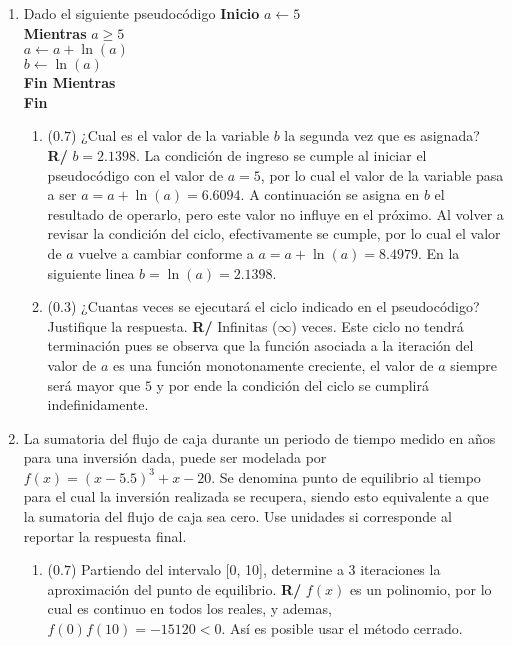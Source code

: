 \documentclass[12pt]{article}
\begin{document}
\vspace{-.5cm}
  \begin{enumerate}[leftmargin=*,widest=9]
    \item Dado el siguiente pseudocódigo
\textbf{Inicio}
\(a\gets 5\)\\
\textbf{Mientras} \(a \geq 5\)\\
\hspace*{1cm}\(a \gets a + \ln(a)\)\\
\hspace*{1cm}\(b \gets \ln(a) \)\\
\textbf{Fin Mientras}\\
\textbf{Fin}\\
    \begin{enumerate}[label=\alph*]
    \item (\(0.7\)) ¿Cual es el valor de la variable \(b\) la segunda vez que es asignada?
     \textbf{R/} \(b=2.1398\). La condición de ingreso se cumple al iniciar el pseudocódigo con el valor de \(a = 5\), por lo cual el valor de la variable pasa a ser \(a = a + \ln(a) = 6.6094\). A continuación se asigna en \(b\) el resultado de operarlo, pero este valor no influye en el próximo. Al volver a revisar la condición del ciclo, efectivamente se cumple, por lo cual el valor de \(a\) vuelve a cambiar conforme a \(a= a+\ln(a) =  8.4979\). En la siguiente linea \(b = \ln(a) = 2.1398 \).
    \item (\(0.3\)) ¿Cuantas veces se ejecutará el ciclo indicado en el pseudocódigo? Justifique la respuesta.
     \textbf{R/} Infinitas (\(\infty\)) veces. Este ciclo no tendrá terminación pues se observa que la función asociada a la iteración del valor de \(a\) es una función monotonamente creciente, el valor de \(a\) siempre será mayor que \(5\) y por ende la condición del ciclo se cumplirá indefinidamente.
    \end{enumerate}
    \item La sumatoria del flujo de caja durante un periodo de tiempo medido en años para una inversión dada, puede ser modelada por \(f(x) = (x-5.5)^3 + x - 20\). Se denomina punto de equilibrio al tiempo para el cual la inversión realizada se recupera, siendo esto equivalente a que la sumatoria del flujo de caja sea cero. Use unidades si corresponde al reportar la respuesta final.
    \begin{enumerate}[label=\alph*]
    \item (\(0.7\)) Partiendo del intervalo [0, 10], determine a 3 iteraciones la aproximación del punto de equilibrio.
\textbf{R/} \(f(x)\) es un polinomio, por lo cual es continuo en todos los reales, y ademas, \(f(0)f(10)= -15120 < 0\). Así es posible usar el método cerrado.

\end{enumerate}
\end{enumerate}
\end{document}
